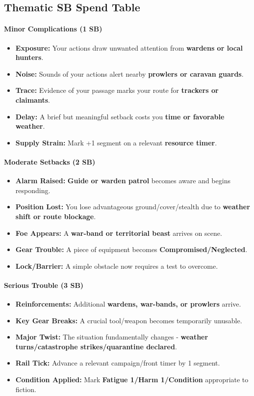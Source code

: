 \subsection*{Thematic SB Spend Table}
\label{sec:wilderness-sb}

\paragraph{Minor Complications (1 SB)}
\begin{itemize}
\item \textbf{Exposure:} Your actions draw unwanted attention from \textbf{wardens or local hunters}.
\item \textbf{Noise:} Sounds of your actions alert nearby \textbf{prowlers or caravan guards}.
\item \textbf{Trace:} Evidence of your passage marks your route for \textbf{trackers or claimants}.
\item \textbf{Delay:} A brief but meaningful setback costs you \textbf{time or favorable weather}.
\item \textbf{Supply Strain:} Mark +1 segment on a relevant \textbf{resource timer}.
\end{itemize}

\paragraph{Moderate Setbacks (2 SB)}
\begin{itemize}
\item \textbf{Alarm Raised:} \textbf{Guide or warden patrol} becomes aware and begins responding.
\item \textbf{Position Lost:} You lose advantageous ground/cover/stealth due to \textbf{weather shift or route blockage}.
\item \textbf{Foe Appears:} A \textbf{war-band or territorial beast} arrives on scene.
\item \textbf{Gear Trouble:} A piece of equipment becomes \textbf{Compromised/Neglected}.
\item \textbf{Lock/Barrier:} A simple obstacle now requires a test to overcome.
\end{itemize}

\paragraph{Serious Trouble (3 SB)}
\begin{itemize}
\item \textbf{Reinforcements:} Additional \textbf{wardens, war-bands, or prowlers} arrive.
\item \textbf{Key Gear Breaks:} A crucial tool/weapon becomes temporarily unusable.
\item \textbf{Major Twist:} The situation fundamentally changes - \textbf{weather turns/catastrophe strikes/quarantine declared}.
\item \textbf{Rail Tick:} Advance a relevant campaign/front timer by 1 segment.
\item \textbf{Condition Applied:} Mark \textbf{Fatigue 1/Harm 1/Condition} appropriate to fiction.
\end{itemize}

